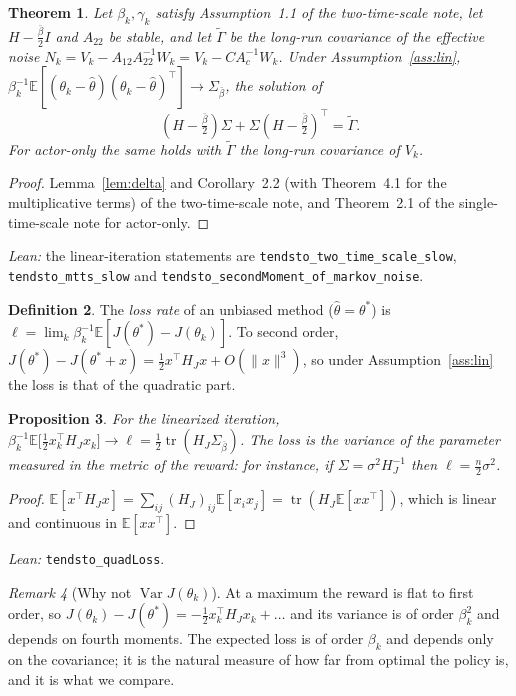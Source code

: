 \documentclass[11pt]{article}
\newtheorem{theorem}{Theorem}[section]
\newtheorem{proposition}[theorem]{Proposition}
\theoremstyle{definition}
\newtheorem{definition}[theorem]{Definition}
\theoremstyle{remark}
\newtheorem{remark}[theorem]{Remark}
\newcommand{\E}{\mathbb{E}}
\DeclareMathOperator{\tr}{tr}
\begin{document}
\begin{theorem}\label{thm:cov}
Let $\beta_k, \gamma_k$ satisfy Assumption~1.1 of the two-time-scale note, let $H - \frac{\bar\beta}{2}I$
and $A_{22}$ be stable, and let $\tilde\Gamma$ be the long-run covariance of the effective noise
$N_k = V_k - A_{12}A_{22}^{-1}W_k = V_k - CA_c^{-1}W_k$. Under Assumption~\ref{ass:lin},
$\beta_k^{-1}\E[(\theta_k - \hat\theta)(\theta_k - \hat\theta)^\top] \to \Sigma_{\bar\beta}$, the solution of
\[
  (H - \tfrac{\bar\beta}{2})\Sigma + \Sigma(H - \tfrac{\bar\beta}{2})^\top = \tilde\Gamma .
\]
For actor-only the same holds with $\tilde\Gamma$ the long-run covariance of $V_k$.
\end{theorem}
\begin{proof}
Lemma~\ref{lem:delta} and Corollary~2.2 (with Theorem~4.1 for the multiplicative terms) of the
two-time-scale note, and Theorem~2.1 of the single-time-scale note for actor-only.
\end{proof}

\noindent\emph{Lean:} the linear-iteration statements are \texttt{tendsto\_two\_time\_scale\_slow},
\texttt{tendsto\_mtts\_slow} and \texttt{tendsto\_secondMoment\_of\_markov\_noise}.

\begin{definition}\label{def:loss}
The \emph{loss rate} of an unbiased method ($\hat\theta = \theta^*$) is
$\ell = \lim_k\beta_k^{-1}\E[J(\theta^*) - J(\theta_k)]$. To second order,
$J(\theta^*) - J(\theta^* + x) = \frac12x^\top H_Jx + O(\|x\|^3)$, so under Assumption~\ref{ass:lin}
the loss is that of the quadratic part.
\end{definition}

\begin{proposition}\label{prop:loss}
For the linearized iteration,
$\beta_k^{-1}\E\big[\frac12x_k^\top H_Jx_k\big] \to \ell = \frac12\tr(H_J\Sigma_{\bar\beta})$. The loss is
the variance of the parameter measured in the metric of the reward: for instance, if
$\Sigma = \sigma^2 H_J^{-1}$ then $\ell = \frac{n}{2}\sigma^2$.
\end{proposition}
\begin{proof}
$\E[x^\top H_Jx] = \sum_{ij}(H_J)_{ij}\E[x_ix_j] = \tr(H_J\E[xx^\top])$, which is linear and
continuous in $\E[xx^\top]$.
\end{proof}
\noindent\emph{Lean:} \texttt{tendsto\_quadLoss}.

\begin{remark}[Why not $\operatorname{Var} J(\theta_k)$]
At a maximum the reward is flat to first order, so $J(\theta_k) - J(\theta^*) = -\frac12x_k^\top H_Jx_k + \dots$
and its variance is of order $\beta_k^2$ and depends on fourth moments. The expected loss is of order
$\beta_k$ and depends only on the covariance; it is the natural measure of how far from optimal
the policy is, and it is what we compare.
\end{remark}
\end{document}
